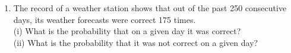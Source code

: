 \renewcommand{\theequation}{\theenumi}
\begin{enumerate}[label=\arabic*.,ref=\thesubsection.\theenumi]
\item The record of a weather station shows that out of the past 250 consecutive days, its weather forecasts were correct 175 times.\\
(i) What is the probability that on a given day it was correct?\\
(ii) What is the probability that it was not correct on a given day?\\
\end{enumerate}